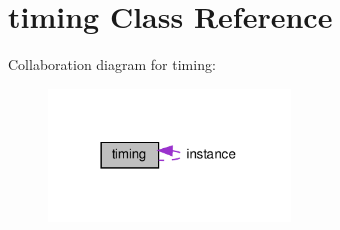 \hypertarget{classtiming}{}\section{timing Class Reference}
\label{classtiming}


Collaboration diagram for timing\+:\nopagebreak
\begin{figure}[H]
\begin{center}
\leavevmode
\includegraphics[width=182pt]{classtiming__coll__graph}
\end{center}
\end{figure}

